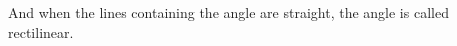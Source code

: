 \documentclass[preview]{standalone}
\begin{document}
\begin{center}
And when the lines containing the angle are straight, the angle is called rectilinear.
\end{center}
\end{document}
